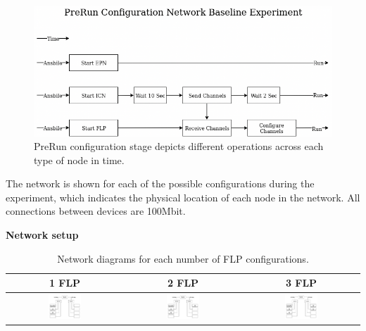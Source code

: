 \documentclass[]{article}
\begin{document}
\begin{center}
	\begin{figure}[H]
		\includegraphics[width=\textwidth]{images/no-zookeeper-flow-n-base-exp}
		\caption{PreRun configuration stage depicts different operations across each type of node in time.}
		\label{fig:ssh}
	\end{figure}
\end{center}

The network is shown for each of the possible configurations during the experiment, which indicates the physical location of each node in the network. All connections between devices are 100Mbit.

\begin{table}[H]
	\textbf{Network setup}
	\begin{center}
		\begin{tabular}{ | c | c | c | }
			\hline
			\textbf{1 FLP} & \textbf{2 FLP} & \textbf{3 FLP} \\ \hline
			
			\includegraphics[width=0.3\textwidth]{images/network-baseline-1} & \includegraphics[width=0.3\textwidth]{images/network-baseline-2} & \includegraphics[width=0.3\textwidth]{images/network-baseline-3} \\ \hline
		\end{tabular}
		\caption{Network diagrams for each number of FLP configurations.}
		\label{tab:networksetupbaseline}
	\end{center}
\end{table}
\end{document}
